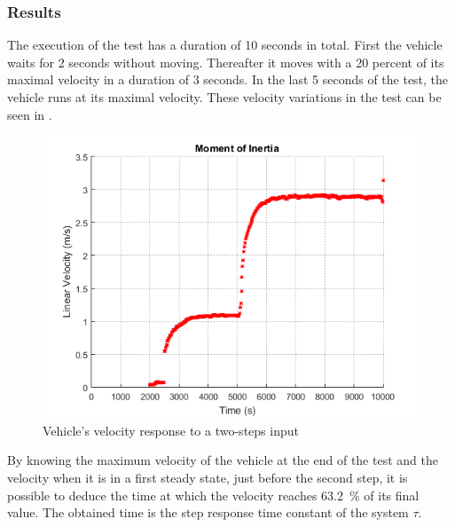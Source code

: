 \subsubsection{Results} \label{inertiaTestResults}
The execution of the test has a duration of 10 seconds in total. First the vehicle waits for 2 seconds without moving. Thereafter it moves with a 20 percent of its maximal velocity in a duration of 3 seconds. In the last 5 seconds of the test, the vehicle runs at its maximal velocity. These velocity variations in the test can be seen in .

\begin{figure}[H]
  \centering
  \includegraphics[scale=0.8]{figures/VehicleMomentOfInertiaTest.png}
  \caption{Vehicle's velocity response to a two-steps input}
  \label{MomentOfInertiaTestPlot}
\end{figure}

By knowing the maximum velocity of the vehicle at the end of the test and the velocity when it is in a first steady state, just before the second step, it is possible to deduce the time at which the velocity reaches \si{\num{63.2} \%} of its final value. The obtained time is the step response time constant of the system $\tau$.

